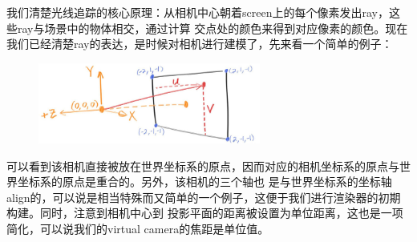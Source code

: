 \documentclass[12pt]{article}
\begin{document}
\indent{}我们清楚光线追踪的核心原理：从相机中心朝着screen上的每个像素发出ray，这些ray与场景中的物体相交，通过计算
交点处的颜色来得到对应像素的颜色。现在我们已经清楚ray的表达，是时候对相机进行建模了，先来看一个简单的例子：
\begin{figure}[h]
\centering
\includegraphics[width=0.65\textwidth]{./imgs/fig-1.03-cam-geom.jpg}
\end{figure}

\indent{}可以看到该相机直接被放在世界坐标系的原点，因而对应的相机坐标系的原点与世界坐标系的原点是重合的。另外，该相机的三个轴也
是与世界坐标系的坐标轴align的，可以说是相当特殊而又简单的一个例子，这便于我们进行渲染器的初期构建。同时，注意到相机中心到
投影平面的距离被设置为单位距离，这也是一项简化，可以说我们的virtual camera的焦距是单位值。
\end{document}
